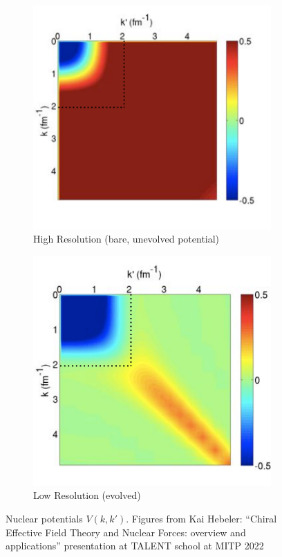 \documentclass[a4paper,11pt]{article}
\begin{document}
\begin{figure}[h]
  \centering
  \begin{subfigure}{0.45\textwidth}
    \centering
    \includegraphics[width=\linewidth]{HighRes.png}
    \caption{High Resolution (bare, unevolved potential) }
    \label{fig:highres}
  \end{subfigure}
  \hfill
  \begin{subfigure}{0.45\textwidth}
    \centering
    \includegraphics[width=\linewidth]{LowRes.png}
    \caption{Low Resolution (evolved)}
    \label{fig:lowres}
  \end{subfigure}
  \caption{Nuclear potentials $V(k,k')$. Figures from Kai Hebeler:
    ``Chiral Effective Field Theory and Nuclear Forces:
  overview and applications'' presentation at TALENT school at MITP 2022}
  \label{fig:SRGtransform}
\end{figure}
\end{document}
